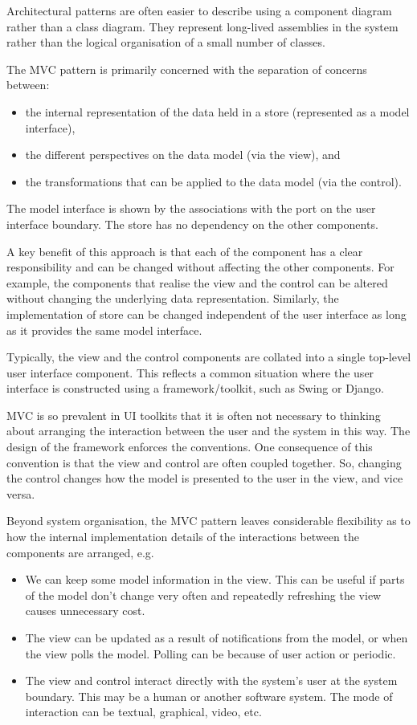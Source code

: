 \documentclass[a4paper, openany]{memoir}
\begin{document}
Architectural patterns are often easier to describe using a component diagram rather than a class diagram. They represent long-lived assemblies in the system rather than the logical organisation of a small number of classes.

The MVC pattern is primarily concerned with the separation of concerns between:
\begin{itemize}
    \item the internal representation of the data held in a store (represented as a model interface),
    \item the different perspectives on the data model (via the view), and
    \item the transformations that can be applied to the data model (via the control).
\end{itemize}
The model interface is shown by the associations with the port on the user interface boundary. The store has no dependency on the other components. 

A key benefit of this approach is that each of the component has a clear responsibility and can be changed without affecting the other components. For example, the components that realise the view and the control can be altered without changing the underlying data representation. Similarly, the implementation of store can be changed independent of the user interface as long as it provides the same model interface. 

Typically, the view and the control components are collated into a single top-level user interface component. This reflects a common situation where the user interface is constructed using a framework/toolkit, such as Swing or Django.

MVC is so prevalent in UI toolkits that it is often not necessary to thinking about arranging the interaction between the user and the system in this way. The design of the framework enforces the conventions. One consequence of this convention is that the view and control are often coupled together. So, changing the control changes how the model is presented to the user in the view, and vice versa.

Beyond system organisation, the MVC pattern leaves considerable flexibility as to how the internal implementation details of the interactions between the components are arranged, e.g.
\begin{itemize}
    \item We can keep some model information in the view. This can be useful if parts of the model don't change very often and repeatedly refreshing the view causes unnecessary cost.
    \item The view can be updated as a result of notifications from the model, or when the view polls the model. Polling can be because of user action or periodic.
    \item The view and control interact directly with the system's user at the system boundary. This may be a human or another software system. The mode of interaction can be textual, graphical, video, etc.
\end{itemize}
\end{document}
